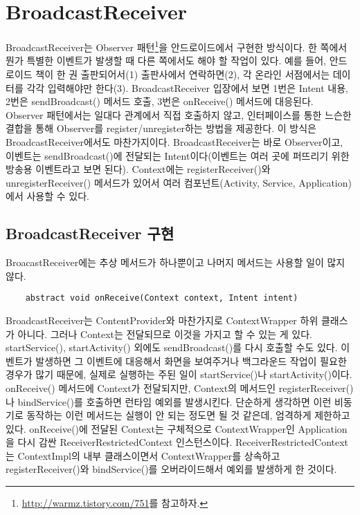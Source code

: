 \chapter{BroadcastReceiver}
BroadcastReceiver는 Observer 패턴\footnote{\url{http://warmz.tistory.com/751}를 참고하자.}을 안드로이드에서 구현한 방식이다.
한 쪽에서 뭔가 특별한 이벤트가 발생할 때 다른 쪽에서도 해야 할 작업이 있다.
예를 들어, 안드로이드 책이 한 권 출판되어서(1) 출판사에서 연락하면(2), 각 온라인 서점에서는 데이터를 각각 입력해야만 한다(3). BroadcastReceiver 입장에서 보면 1번은 Intent 내용, 2번은 sendBroadcast() 메서드 호출, 3번은 onReceive() 메서드에 대응된다.\\

Observer 패턴에서는 일대다 관계에서 직접 호출하지 않고, 인터페이스를 통한 느슨한 결합을 통해 Observer를 register/unregister하는 방법을 제공한다.
이 방식은 BroadcastReceiver에서도 마찬가지이다. BroadcastReceiver는 바로 Observer이고, 이벤트는 sendBroadcast()에 전달되는 Intent이다(이벤트는 여러 곳에 퍼뜨리기 위한 방송용 이벤트라고 보면 된다). Context에는 registerReceiver()와 unregisterReceiver() 메서드가 있어서 여러 컴포넌트(Activity, Service, Application)에서 사용할 수 있다.

\section{BroadcastReceiver 구현}
BroacastReceiver에는 추상 메서드가 하나뿐이고 나머지 메서드는 사용할 일이 많지 않다.
\begin{verbatim}
	abstract void onReceive(Context context, Intent intent)
\end{verbatim}

BroadcastReceiver는 ContentProvider와 마찬가지로 ContextWrapper 하위 클래스가 아니다. 그러나 Context는 전달되므로 이것을 가지고 할 수 있는 게 있다.
startService(), startActivity() 외에도 sendBroadcast()를 다시 호출할 수도 있다. 
이벤트가 발생하면 그 이벤트에 대응해서 화면을 보여주거나 백그라운드 작업이 필요한 경우가 많기 때문에, 실제로 실행하는 주된 일이 startService()나 startActivity()이다.\\

onReceive() 메서드에 Context가 전달되지만, Context의 메서드인 registerReceiver()나 bindService()를 호출하면 런타임 예외를 발생시킨다. 단순하게 생각하면 이런 비동기로 동작하는 이런 메서드는 실행이 안 되는 정도면 될 것 같은데, 엄격하게 제한하고 있다. onReceive()에 전달된 Context는 구체적으로 ContextWrapper인 Application을 다시 감싼 ReceiverRestrictedContext 인스턴스이다. ReceiverRestrictedContext는 ContextImpl의 내부 클래스이면서 ContextWrapper를 상속하고 registerReceiver()와 bindService()를 오버라이드해서 예외를 발생하게 한 것이다.\\

